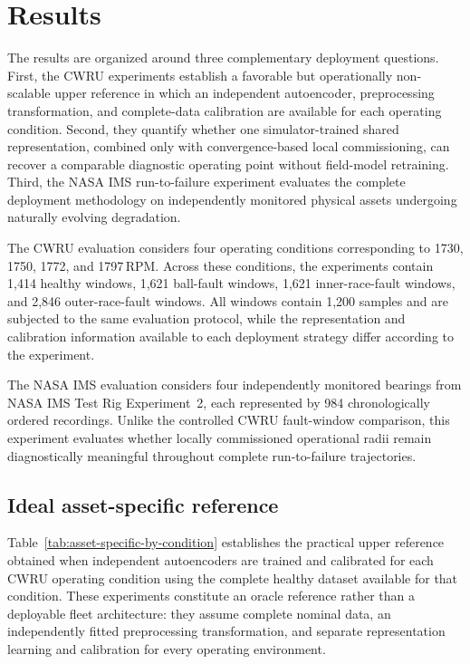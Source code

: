 \documentclass{trbunofficial}
\begin{document}
\section{Results}
\label{sec:results}

The results are organized around three complementary deployment questions.
First, the CWRU experiments establish a favorable but operationally
non-scalable upper reference in which an independent autoencoder,
preprocessing transformation, and complete-data calibration are available
for each operating condition. Second, they quantify whether one
simulator-trained shared representation, combined only with
convergence-based local commissioning, can recover a comparable diagnostic
operating point without field-model retraining. Third, the NASA IMS
run-to-failure experiment evaluates the complete deployment methodology on
independently monitored physical assets undergoing naturally evolving
degradation.

The CWRU evaluation considers four operating conditions corresponding to
1730, 1750, 1772, and 1797\,RPM. Across these conditions, the experiments
contain 1,414 healthy windows, 1,621 ball-fault windows, 1,621
inner-race-fault windows, and 2,846 outer-race-fault windows. All windows
contain 1,200 samples and are subjected to the same evaluation protocol,
while the representation and calibration information available to each
deployment strategy differ according to the experiment.

The NASA IMS evaluation considers four independently monitored bearings
from NASA IMS Test Rig Experiment~2, each represented by 984
chronologically ordered recordings.
Unlike the controlled CWRU fault-window comparison, this experiment evaluates
whether locally commissioned operational radii remain diagnostically
meaningful throughout complete run-to-failure trajectories.

\subsection{Ideal asset-specific reference}
\label{sec:oracle-results}

Table~\ref{tab:asset-specific-by-condition} establishes the practical
upper reference obtained when independent autoencoders are trained and
calibrated for each CWRU operating condition using the complete healthy
dataset available for that condition. These experiments
constitute an oracle reference rather than a deployable fleet architecture:
they assume complete nominal data, an independently fitted preprocessing
transformation, and separate representation learning and calibration for
every operating environment.
\end{document}
